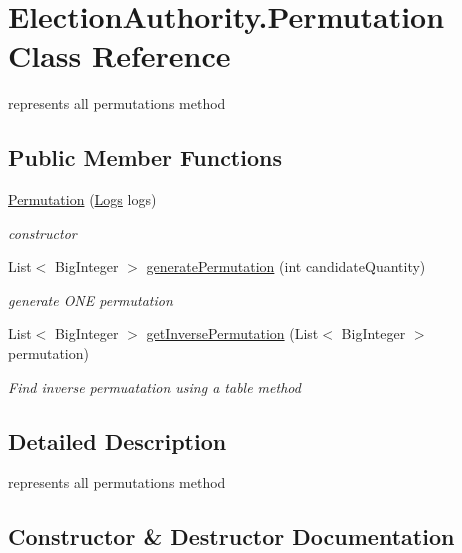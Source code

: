 \hypertarget{class_election_authority_1_1_permutation}{}\section{Election\+Authority.\+Permutation Class Reference}
\label{class_election_authority_1_1_permutation}


represents all permutation\textquotesingle{}s method  


\subsection*{Public Member Functions}
\begin{DoxyCompactItemize}
\item 
\hyperlink{class_election_authority_1_1_permutation_a1bc4b8fbf2f81b64d4df43d842887f20}{Permutation} (\hyperlink{class_election_authority_1_1_logs}{Logs} logs)
\begin{DoxyCompactList}\small\item\em constructor \end{DoxyCompactList}\item 
List$<$ Big\+Integer $>$ \hyperlink{class_election_authority_1_1_permutation_aca696062c7feeb6e369163d85788f041}{generate\+Permutation} (int candidate\+Quantity)
\begin{DoxyCompactList}\small\item\em generate O\+N\+E permutation \end{DoxyCompactList}\item 
List$<$ Big\+Integer $>$ \hyperlink{class_election_authority_1_1_permutation_a986143acc7665192f2d5a577de873867}{get\+Inverse\+Permutation} (List$<$ Big\+Integer $>$ permutation)
\begin{DoxyCompactList}\small\item\em Find inverse permuatation using a table method \end{DoxyCompactList}\end{DoxyCompactItemize}


\subsection{Detailed Description}
represents all permutation\textquotesingle{}s method 



\subsection{Constructor \& Destructor Documentation}
\hypertarget{class_election_authority_1_1_permutation_a1bc4b8fbf2f81b64d4df43d842887f20}{}
